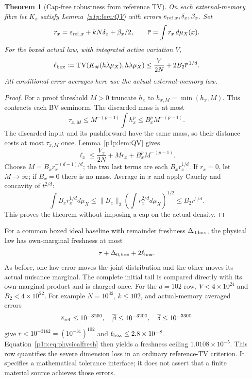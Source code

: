 \documentclass[11pt]{article}
\numberwithin{equation}{section}
\newtheorem{theorem}{Theorem}[section]
\theoremstyle{definition}
\theoremstyle{remark}
\begin{document}
\begin{theorem}[Cap-free robustness from reference TV]
\label{p1p:thm:CFQ}
On each external-memory fibre let $K_x$ satisfy
Lemma~\ref{p1p:lem:QV} with errors $e_{{\rm ref},x},\delta_x,\beta_x$.
Set
\[
 r_x=e_{{\rm ref},x}+kN\delta_x+\beta_x/2,
 \qquad\overline r=\int r_x\,d\mu_X(x).
\]
For the boxed actual law, with integrated active variation $V$,
\begin{equation}\label{p1p:eq:CFQ}
 \ell_{\rm box}:=\operatorname{TV}(K_\#(h\lambda\mu_X),h\lambda\mu_X)
 \leq\frac{V}{2N}+2B_2\overline r^{\,1/d}.
\end{equation}
All conditional error averages here use the actual external-memory law.
\end{theorem}
\begin{proof}
For a proof threshold $M>0$ truncate $h_x$ to $h_{x,M}=\min(h_x,M)$.
This contracts each BV seminorm. The discarded mass is at most
\[
 \tau_{x,M}\leq M^{-(p-1)}\int h_x^p
 \leq B_x^pM^{-(p-1)}.
\]
The discarded input and its pushforward have the same mass, so their
distance costs at most $\tau_{x,M}$ once. Lemma~\ref{p1p:lem:QV} gives
\[
 \ell_x\leq\frac{V_x}{2N}+Mr_x+B_x^pM^{-(p-1)}.
\]
Choose $M=B_xr_x^{-(d-1)/d}$; the two last terms are each
$B_xr_x^{1/d}$. If $r_x=0$, let $M\to\infty$; if $B_x=0$ there is no mass.
Average in $x$ and apply Cauchy and concavity of $t^{2/d}$:
\[
 \int B_xr_x^{1/d}d\mu_X
 \leq\|B_x\|_2\left(\int r_x^{2/d}d\mu_X\right)^{1/2}
 \leq B_2\overline r^{1/d}.
\]
This proves the theorem without imposing a cap on the actual density.
\end{proof}

For a common boxed ideal baseline with remainder freshness
$\Delta_{0,\rm box}$, the physical law has own-marginal freshness at most
\begin{equation}\label{p1p:eq:physicalfresh}
 \tau+\Delta_{0,\rm box}+2\ell_{\rm box}.
\end{equation}
As before, one law error moves the joint distribution and the other
moves its actual nuisance marginal. The complete initial tail is
compared directly with its own-marginal product and is charged once.
For the $d=102$ row, $V<4\times10^{24}$ and $B_2<4\times10^{22}$.
For example $N=10^{32}$, $k\leq102$, and actual-memory averaged errors
\[
 \overline e_{\rm ref}\leq10^{-3200},\quad
 \overline\beta\leq10^{-3200},\quad
 \overline\delta\leq10^{-3300}
\]
give $\overline r<10^{-3162}=(10^{-31})^{102}$ and
$\ell_{\rm box}\leq2.8\times10^{-8}$. Equation~\eqref{p1p:eq:physicalfresh}
then yields a freshness ceiling $1.0108\times10^{-5}$.
This row quantifies the severe dimension loss in an ordinary
reference-TV criterion. It specifies a mathematical tolerance interface;
it does not assert that a finite material source achieves those errors.
\end{document}
